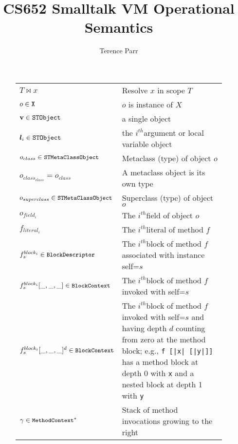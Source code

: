 \documentclass[11pt]{article}
\title{CS652 Smalltalk VM Operational Semantics}
\author{Terence Parr}
\newcommand{\ith}{$i^{th}$}
\begin{document}
\maketitle

\def\arraystretch{1.25}

\begin{figure}
\begin{center}
\begin{tabular}{l p{8cm}}
$T \bowtie x$ & Resolve $x$ in scope $T$ \\

$o \in \text{\tt X}$ & $o$ is instance of $X$\\

${\bf v} \in \text{\tt STObject}$ & a single object \\

${\bm l_i} \in \text{\tt STObject}$ & the \ith argument or local variable object \\

$o_{class} \in \text{\tt\small STMetaClassObject}$ & Metaclass (type) of object $o$\\

$o_{class_{class}}=o_{class}$ &  A metaclass object is its own type\\

$o_{superclass} \in \text{\tt\small STMetaClassObject}$ & Superclass (type) of object $o$\\

$o_{field_i}$ & The \ith field of object $o$ \\

$f_{literal_i}$ & The \ith literal of method $f$ \\

$f^{block_i}_s \in \text{\tt\small BlockDescriptor}$ & The \ith block of method $f$ associated with instance self=$s$\\

$f^{block_i}_s[\_,\_,\_] \in \text{\tt\small BlockContext}$ & The \ith block of method $f$ invoked with self=$s$\\

$f^{block_i}_s[\_,\_,\_]^d \in \text{\tt\small BlockContext}$ & The \ith block of method $f$ invoked with self=$s$ and having depth $d$ counting from zero at the method block; e.g., {\tt f [|x| [|y|]]} has a method block at depth 0 with {\tt x} and a nested block at depth 1 with {\tt y} \\

$\gamma \in \text{\tt\small MethodContext}^*$ & Stack of method invocations growing to the right\\


\end{tabular}
\end{center}
\end{figure}
\end{document}
